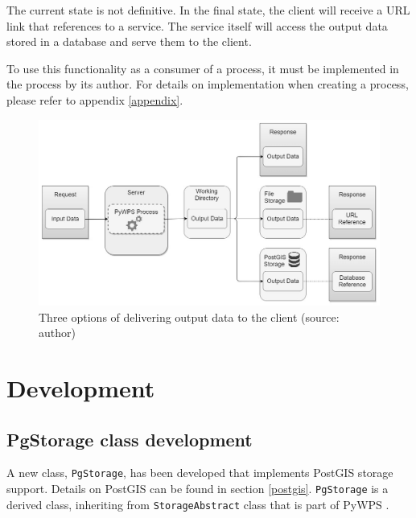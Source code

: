 The current state is not definitive. In the final state, the client
will receive a URL link that references to a  service. The
 service itself will access the output data stored in a
database and serve them to the client.





To use this functionality as a consumer of a process, it must be implemented in the process by its author. For details on implementation when creating a process, please refer to appendix \ref{appendix}.


  
\begin{figure}[H] \centering
\includegraphics[width=426pt]{./pictures/options.jpg}
    \caption[Three options of delivering output data to the client]{Three options of delivering output data to the client (source: {author})}
    \label{fig:options}
\end{figure}



\section{Development} 

\subsection{PgStorage class development} 

A new class, \texttt{PgStorage}, has been developed that implements
PostGIS storage support. Details on PostGIS can be found in section
 \ref{postgis}. \texttt{PgStorage} is a derived class, inheriting from
\texttt{StorageAbstract} class that is part of PyWPS .

